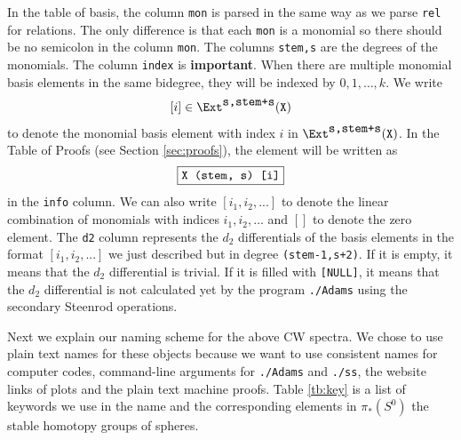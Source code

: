 \documentclass{amsart}
\numberwithin{equation}{section}
\begin{document}
\begin{notation}\label{nt:basis}
    In the table of basis, the column \verb|mon| is parsed in the same way as we parse \verb|rel| for relations. The only difference is that each \verb|mon| is a monomial so there should be no semicolon in the column \verb|mon|. The columns \texttt{stem,s} are the degrees of the monomials. The column \texttt{index} is \textbf{important}. When there are multiple monomial basis elements in the same bidegree, they will be indexed by $0,1,\dots,k$. We write
    $$[i]\in \Ext^{\verb|s,stem+s|}(\verb|X|)$$
    to denote the monomial basis element  with index $i$ in $\Ext^{\verb|s,stem+s|}(\verb|X|)$. In the Table of Proofs (see Section \ref{sec:proofs}), the element will be written as
    $$\fbox{\texttt{X (stem, s) [i]}}$$
    in the \verb|info| column. We can also write $[i_1,i_2,...]$ to denote the linear combination of monomials with indices $i_1,i_2,\dots$ and $[]$ to denote the zero element. The \verb|d2| column represents the $d_2$ differentials of the basis elements in the format $[i_1,i_2,...]$ we just described but in degree \verb|(stem-1,s+2)|. If it is empty, it means that the $d_2$ differential is trivial. If it is filled with \verb|[NULL]|, it means that the $d_2$ differential is not calculated yet by the program \texttt{./Adams} using the secondary Steenrod operations.
\end{notation}


Next we explain our naming scheme for the above CW spectra. We chose to use plain text names for these objects because we want to use consistent names for computer codes, command-line arguments for \verb|./Adams| and \verb|./ss|, the website links of plots and the plain text machine proofs. Table \ref{tb:key} is a list of keywords we use in the name and the corresponding elements in $\pi_*(S^0)$ the stable homotopy groups of spheres.
\end{document}
